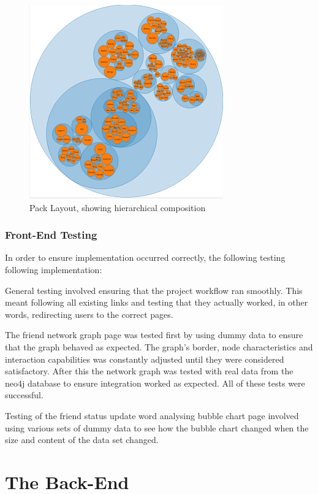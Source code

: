 \documentclass[12pt,onecolumn]{article}
\begin{document}
   \begin{figure}
   	\centering
   	\includegraphics[scale=1]{packlayout.PNG}
   	\caption{Pack Layout, showing hierarchical composition} \label{fig:packlayout}
   \end{figure}
   
   \subsubsection{Front-End Testing}
   
   In order to ensure implementation occurred correctly, the following testing following implementation: 
   
   General testing involved ensuring that the project workflow ran smoothly. This meant following all existing links and testing that they actually worked, in other words, redirecting users to the correct pages.
   
   The friend network graph page was tested first by using dummy data to ensure that the graph behaved as expected. The graph's border, node characteristics and interaction capabilities was constantly adjusted until they were considered satisfactory. After this the network graph was tested with real data from the neo4j database to ensure integration worked as expected. All of these tests were successful.
   
   Testing of the friend status update word analysing bubble chart page involved using various sets of dummy data to see how the bubble chart changed when the size and content of the data set changed.
   
	
	\section{The Back-End}
	
\end{document}

